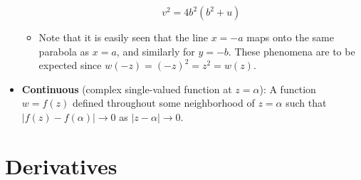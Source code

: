 \documentclass[../main.tex]{subfiles}
\begin{document}
\begin{itemize}
\begin{itemize}
\begin{equation*}
            v^2 = 4b^2(b^2+u)
        \end{equation*}
        \item Note that it is easily seen that the line $x=-a$ maps onto the same parabola as $x=a$, and similarly for $y=-b$. These phenomena are to be expected since $w(-z)=(-z)^2=z^2=w(z)$.
    \end{itemize}
    \item \textbf{Continuous} (complex single-valued function at $z=\alpha$): A function $w=f(z)$ defined throughout some neighborhood of $z=\alpha$ such that $|f(z)-f(\alpha)|\to 0$ as $|z-\alpha|\to 0$.
\end{itemize}



\section{Derivatives}
\end{document}

